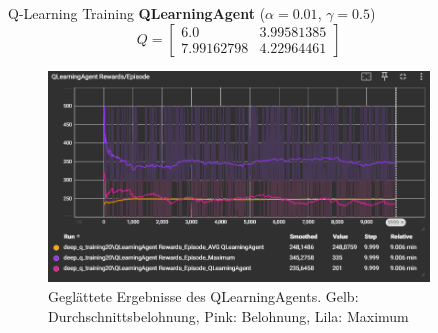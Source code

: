 \documentclass[final]{beamer}
\newlength{\sepwidth}
\newlength{\colwidth}
\newcommand{\separatorcolumn}{\begin{column}{\sepwidth}\end{column}}
\begin{document}
\begin{frame}[t]
\begin{columns}[t]
\begin{column}{\colwidth}
  \begin{alertblock}{Q-Learning Training}
    \textbf{QLearningAgent} ($\alpha = 0.01$, $\gamma = 0.5$)
     \begin{equation*}
       Q = \left[ \begin{array}{cc} 6.0 & 3.99581385 \\ 7.99162798 & 4.22964461 \end{array} \right]
     \end{equation*}
    
     \begin{figure}[h]
      \centering
      \includegraphics[width=20cm]{logos/qlearning.PNG}
      \caption{Geglättete Ergebnisse des QLearningAgents. Gelb: Durchschnittsbelohnung, Pink: Belohnung, Lila: Maximum}
    \end{figure}
  
  \end{alertblock}

  


\end{column}

\separatorcolumn

\begin{column}{\colwidth}


\end{column}
\end{columns}
\end{frame}
\end{document}
